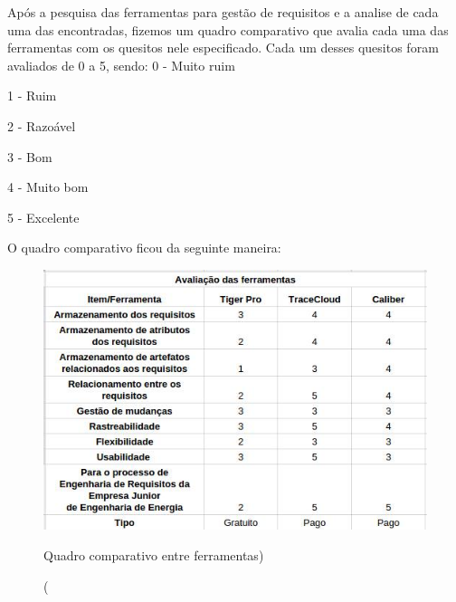 Após a pesquisa das ferramentas para gestão de requisitos e a analise de cada uma das encontradas, fizemos um quadro comparativo que avalia cada uma das ferramentas com os quesitos nele especificado. Cada um desses quesitos foram avaliados de 0 a 5, sendo:
0 - Muito ruim

1 - Ruim

2 - Razoável

3 - Bom

4 - Muito bom

5 - Excelente

O quadro comparativo ficou da seguinte maneira:
\begin{figure}[!htb]
\centering
\includegraphics[scale=0.5]{figuras/quadro.jpg}
\caption(Quadro comparativo entre ferramentas)
\end{figure}


